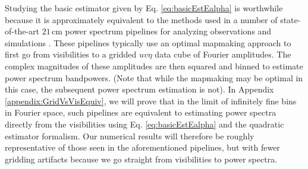 \documentclass[twocolumn,aps,prd,nofootinbib,showpacs]{revtex4-1}
\begin{document}
Studying the basic estimator given by Eq. \eqref{eq:basicEstEalpha} is worthwhile because it is approximately equivalent to the methods used in a number of state-of-the-art $21\,\textrm{cm}$ power spectrum pipelines for  analyzing observations and simulations \cite{Bernardi2013,Thyagarajan2013,Hazelton2013}.  These pipelines typically use an optimal mapmaking approach \cite{Tegmark1997a,Morales2008} to first go from visibilities to a gridded $uv\eta$ data cube of Fourier amplitudes.  The complex magnitudes of these amplitudes are then squared and binned to estimate power spectrum bandpowers.  (Note that while the mapmaking may be optimal in this case, the subsequent power spectrum estimation is not).  In Appendix \ref{appendix:GridVsVisEquiv}, we will prove that in the limit of infinitely fine bins in Fourier space, such pipelines are equivalent to estimating power spectra directly from the visibilities using Eq. \eqref{eq:basicEstEalpha} and the quadratic estimator formalism.  Our numerical results will therefore be roughly representative of those seen in the aforementioned pipelines, but with fewer gridding artifacts because we go straight from visibilities to power spectra.
\end{document}
